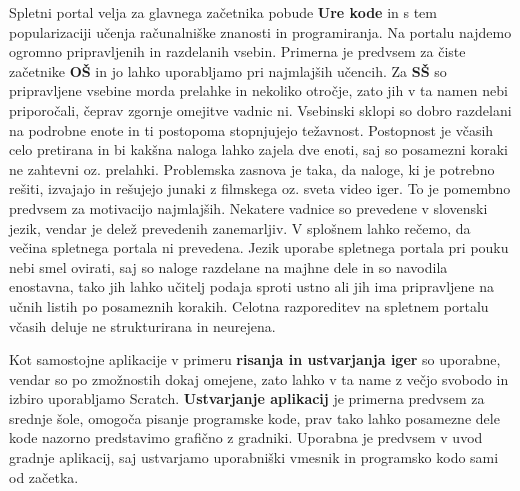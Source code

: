 Spletni portal velja za glavnega začetnika pobude \textbf{Ure kode} in
s tem popularizaciji učenja računalniške znanosti in programiranja. Na
portalu najdemo ogromno pripravljenih in razdelanih vsebin. Primerna
je predvsem za čiste začetnike \textbf{OŠ} in jo lahko uporabljamo pri
najmlajših učencih. Za \textbf{SŠ} so pripravljene vsebine morda
prelahke in nekoliko otročje, zato jih v ta namen nebi priporočali,
čeprav zgornje omejitve vadnic ni. Vsebinski sklopi so dobro razdelani
na podrobne enote in ti postopoma stopnjujejo težavnost. Postopnost je
včasih celo pretirana in bi kakšna naloga lahko zajela dve enoti, saj
so posamezni koraki ne zahtevni oz. prelahki. Problemska zasnova je
taka, da naloge, ki je potrebno rešiti, izvajajo in rešujejo junaki z
filmskega oz. sveta video iger. To je pomembno predvsem za motivacijo
najmlajših. Nekatere vadnice so prevedene v slovenski jezik, vendar je
delež prevedenih zanemarljiv. V splošnem lahko rečemo, da večina
spletnega portala ni prevedena. Jezik uporabe spletnega portala pri
pouku nebi smel ovirati, saj so naloge razdelane na majhne dele in so
navodila enostavna, tako jih lahko učitelj podaja sproti ustno ali jih
ima pripravljene na učnih listih po posameznih korakih. Celotna
razporeditev na spletnem portalu včasih deluje ne strukturirana in
neurejena. 

Kot samostojne aplikacije v primeru \textbf{risanja in ustvarjanja
  iger} so uporabne, vendar so po zmožnostih dokaj omejene, zato lahko
v ta name z večjo svobodo in izbiro uporabljamo
Scratch. \textbf{Ustvarjanje aplikacij} je primerna predvsem za
srednje šole, omogoča pisanje programske kode, prav tako lahko
posamezne dele kode nazorno predstavimo grafično z gradniki. Uporabna
je predvsem v uvod gradnje aplikacij, saj ustvarjamo uporabniški
vmesnik in programsko kodo sami od začetka.

